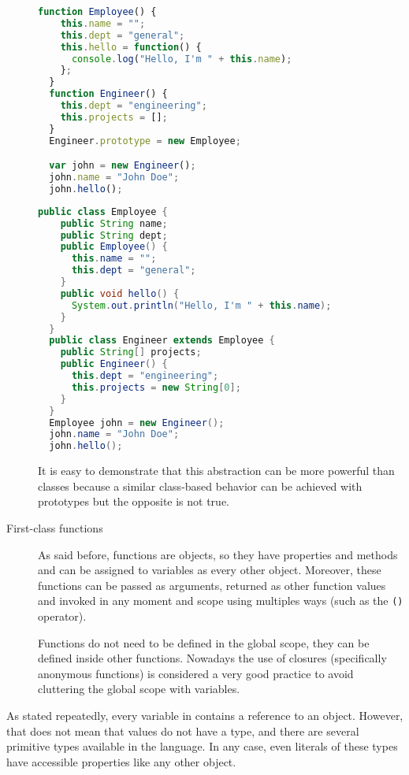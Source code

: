\begin{description}
\begin{lstlisting}[float=htbp,label=oopjs,language=javascript,caption=Inheritance in JavaScript]
  function Employee() {
    this.name = "";
    this.dept = "general";
    this.hello = function() {
      console.log("Hello, I'm " + this.name);
    };
  }
  function Engineer() {
    this.dept = "engineering";
    this.projects = [];
  }
  Engineer.prototype = new Employee;

  var john = new Engineer();
  john.name = "John Doe";
  john.hello();
\end{lstlisting}

\begin{lstlisting}[float=htbp,label=oopjava,language=java,caption=Inheritance in Java]
  public class Employee {
    public String name;
    public String dept;
    public Employee() {
      this.name = "";
      this.dept = "general";
    }
    public void hello() {
      System.out.println("Hello, I'm " + this.name);
    }
  }
  public class Engineer extends Employee {
    public String[] projects;
    public Engineer() {
      this.dept = "engineering";
      this.projects = new String[0];
    }
  }
  Employee john = new Engineer();
  john.name = "John Doe";
  john.hello();
\end{lstlisting}
  
  It is easy to demonstrate that this abstraction can be more powerful than classes because a similar class-based  behavior can be achieved with prototypes but the opposite is not true.
  \item[First-class functions] As said before,  functions are objects, so they have properties and methods and can be assigned to variables as every other object.
  Moreover, these functions can be passed as arguments, returned as other function values and invoked in any moment and scope using multiples ways (such as the \verb+()+ operator).
  
  Functions do not need to be defined in the global scope, they can be defined inside other functions.
  Nowadays the use of closures (specifically anonymous functions) is considered a very good practice to avoid cluttering the global scope with variables.
\end{description}

As stated repeatedly, every variable in  contains a reference to an object.
However, that does not mean that values do not have a type, and there are several primitive types available in the language.
In any case, even literals of these types have accessible properties like any other object.

